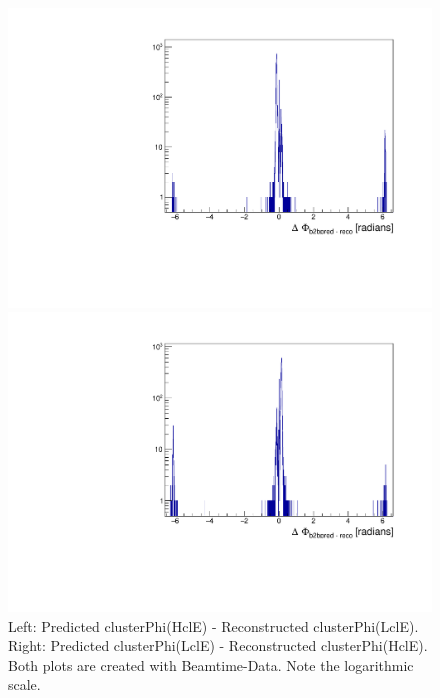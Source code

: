 \documentclass[a4paper,11pt,twosided,final,german,openbib,pdftex,listof=totoc,bibliography=totoc]{scrbook}
\begin{document}
\begin{appendix}
\begin{figure}[h!]
	\centering
	\begin{minipage}[b]{0.45\linewidth}
		\centering
		\includegraphics[width=\textwidth]{AnhangPlots/b2b_ProbeTag_Data_Whole.pdf}
	\end{minipage}
	\hspace{0.5cm}
	\begin{minipage}[b]{0.45\linewidth}
		\centering
		\includegraphics[width=\textwidth]{AnhangPlots/b2b_TagProbe_Data_Whole.pdf}
	\end{minipage}
	\caption[b2bClusterPhi - clusterPhi For Data (Whole Range)]{Left: Predicted clusterPhi(HclE) - Reconstructed clusterPhi(LclE). Right: Predicted clusterPhi(LclE) - Reconstructed clusterPhi(HclE). Both plots are created with Beamtime-Data. Note the logarithmic scale.}
	\label{fig:b2bData_Whole}
\end{figure}







\end{appendix}
\end{document}
